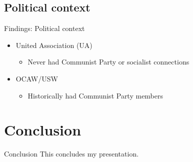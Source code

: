 \documentclass{beamer}
\begin{document}
\subsection{Political context}
\begin{frame}{Findings: Political context}
	\begin{itemize}
		\item United Association (UA)
		\begin{itemize}
			\item Never had Communist Party or socialist connections
		\end{itemize}
		\item OCAW/USW
			\begin{itemize}
				\item Historically had Communist Party members
			\end{itemize}
	\end{itemize}
\end{frame}



\section{Conclusion}
\begin{frame}{Conclusion}
  This concludes my presentation.
\end{frame}
\end{document}
